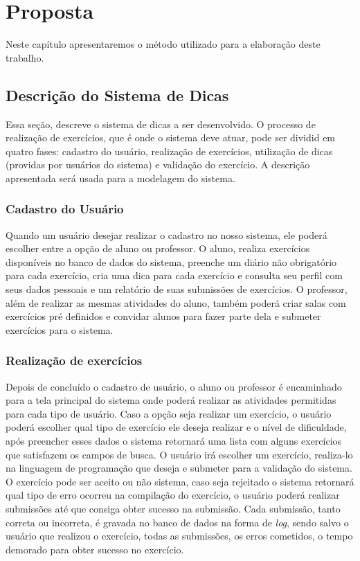 \chapter{Proposta}

Neste capítulo apresentaremos o método utilizado para a elaboração deste trabalho.

\section{Descrição do Sistema de Dicas}

Essa seção, descreve o sistema de dicas a ser desenvolvido. O processo de realização de exercícios, que é onde o sistema deve atuar, pode ser dividid em quatro fases: cadastro do usuário, realização de exercícios, utilização de dicas (providas por usuários do sistema) e validação do exercício. A descrição apresentada será usada para a modelagem do sistema.

\subsection{Cadastro do Usuário}

Quando um usuário desejar realizar o cadastro no nosso sistema, ele poderá escolher entre a opção de aluno ou professor. O aluno, realiza exercícios disponíveis no banco de dados do sistema, preenche um diário não obrigatório para cada exercício, cria uma dica para cada exercício e consulta seu perfil com seus dados pessoais e um relatório de suas submissões de exercícios. O professor, além de realizar as mesmas atividades do aluno, também poderá criar salas com exercícios pré definidos e convidar alunos para fazer parte dela e submeter exercícios para o sistema.

\subsection{Realização de exercícios}

Depois de concluído o cadastro de usuário, o aluno ou professor é encaminhado para a tela principal do sistema onde poderá realizar as atividades permitidas para cada tipo de usuário. Caso a opção seja realizar um exercício, o usuário poderá escolher qual tipo de exercício ele deseja realizar e o nível de dificuldade, após preencher esses dados o sistema retornará uma lista com alguns exercícios que satisfazem os campos de busca. O usuário irá escolher um exercício, realiza-lo na linguagem de programação que deseja e submeter para a validação do sistema. O exercício pode ser aceito ou não sistema, caso seja rejeitado o sistema retornará qual tipo de erro ocorreu na compilação do exercício, o usuário poderá realizar submissões até que consiga obter sucesso na submissão. Cada submissão, tanto correta ou incorreta, é gravada no banco de dados na forma de \textit{log}, sendo salvo o usuário que realizou o exercício, todas as submissões, os erros cometidos, o tempo demorado para obter sucesso no exercício.

